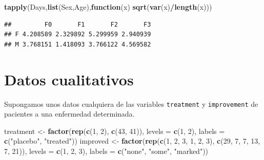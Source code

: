 \documentclass[]{book}
\newenvironment{Shaded}{\begin{snugshade}}{\end{snugshade}}
\newcommand{\KeywordTok}[1]{\textcolor[rgb]{0.13,0.29,0.53}{\textbf{#1}}}
\newcommand{\DataTypeTok}[1]{\textcolor[rgb]{0.13,0.29,0.53}{#1}}
\newcommand{\DecValTok}[1]{\textcolor[rgb]{0.00,0.00,0.81}{#1}}
\newcommand{\StringTok}[1]{\textcolor[rgb]{0.31,0.60,0.02}{#1}}
\newcommand{\ControlFlowTok}[1]{\textcolor[rgb]{0.13,0.29,0.53}{\textbf{#1}}}
\newcommand{\OperatorTok}[1]{\textcolor[rgb]{0.81,0.36,0.00}{\textbf{#1}}}
\newcommand{\NormalTok}[1]{#1}
\begin{document}
\begin{Shaded}
\begin{Highlighting}[]
\KeywordTok{tapply}\NormalTok{(Days,}\KeywordTok{list}\NormalTok{(Sex,Age),}\ControlFlowTok{function}\NormalTok{(x) }\KeywordTok{sqrt}\NormalTok{(}\KeywordTok{var}\NormalTok{(x)}\OperatorTok{/}\KeywordTok{length}\NormalTok{(x)))}
\end{Highlighting}
\end{Shaded}

\begin{verbatim}
##         F0       F1       F2       F3
## F 4.208589 2.329892 5.299959 2.940939
## M 3.768151 1.418093 3.766122 4.569582
\end{verbatim}

\section{Datos cualitativos}\label{datos-cualitativos}

Supongamos unos datos cualquiera de las variables \texttt{treatment} y
\texttt{improvement} de pacientes a una enfermedad determinada.

\begin{Shaded}
\begin{Highlighting}[]
\NormalTok{treatment <-}\StringTok{ }\KeywordTok{factor}\NormalTok{(}\KeywordTok{rep}\NormalTok{(}\KeywordTok{c}\NormalTok{(}\DecValTok{1}\NormalTok{, }\DecValTok{2}\NormalTok{), }\KeywordTok{c}\NormalTok{(}\DecValTok{43}\NormalTok{, }\DecValTok{41}\NormalTok{)), }\DataTypeTok{levels =} \KeywordTok{c}\NormalTok{(}\DecValTok{1}\NormalTok{, }\DecValTok{2}\NormalTok{),}
                    \DataTypeTok{labels =} \KeywordTok{c}\NormalTok{(}\StringTok{"placebo"}\NormalTok{, }\StringTok{"treated"}\NormalTok{))}
\NormalTok{improved <-}\StringTok{ }\KeywordTok{factor}\NormalTok{(}\KeywordTok{rep}\NormalTok{(}\KeywordTok{c}\NormalTok{(}\DecValTok{1}\NormalTok{, }\DecValTok{2}\NormalTok{, }\DecValTok{3}\NormalTok{, }\DecValTok{1}\NormalTok{, }\DecValTok{2}\NormalTok{, }\DecValTok{3}\NormalTok{), }\KeywordTok{c}\NormalTok{(}\DecValTok{29}\NormalTok{, }\DecValTok{7}\NormalTok{, }\DecValTok{7}\NormalTok{, }\DecValTok{13}\NormalTok{, }\DecValTok{7}\NormalTok{, }\DecValTok{21}\NormalTok{)),}
                   \DataTypeTok{levels =} \KeywordTok{c}\NormalTok{(}\DecValTok{1}\NormalTok{, }\DecValTok{2}\NormalTok{, }\DecValTok{3}\NormalTok{),}
                   \DataTypeTok{labels =} \KeywordTok{c}\NormalTok{(}\StringTok{"none"}\NormalTok{, }\StringTok{"some"}\NormalTok{, }\StringTok{"marked"}\NormalTok{))}
\end{Highlighting}
\end{Shaded}
\end{document}
